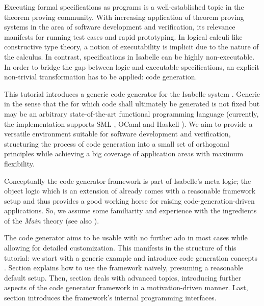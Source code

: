 %
\begin{isabellebody}%
\def\isabellecontext{Codegen}%
%
\isadelimtheory
\isanewline
%
\endisadelimtheory
%
\isatagtheory
%
\endisatagtheory
{\isafoldtheory}%
%
\isadelimtheory
%
\endisadelimtheory
%
\isadelimML
%
\endisadelimML
%
\isatagML
%
\endisatagML
{\isafoldML}%
%
\isadelimML
%
\endisadelimML
%
\isamarkuptrue%
%
\isamarkuptrue%
%
\isamarkuptrue%
%
\begin{isamarkuptext}%
Executing formal specifications as programs is a well-established
  topic in the theorem proving community.  With increasing
  application of theorem proving systems in the area of
  software development and verification, its relevance manifests
  for running test cases and rapid prototyping.  In logical
  calculi like constructive type theory,
  a notion of executability is implicit due to the nature
  of the calculus.  In contrast, specifications in Isabelle
  can be highly non-executable.  In order to bridge
  the gap between logic and executable specifications,
  an explicit non-trivial transformation has to be applied:
  code generation.

  This tutorial introduces a generic code generator for the
  Isabelle system \cite{isa-tutorial}.
  Generic in the sense that the
   for which code shall ultimately be
  generated is not fixed but may be an arbitrary state-of-the-art
  functional programming language (currently, the implementation
  supports SML \cite{SML}, OCaml \cite{OCaml} and Haskell
  \cite{haskell-revised-report}).
  We aim to provide a
  versatile environment
  suitable for software development and verification,
  structuring the process
  of code generation into a small set of orthogonal principles
  while achieving a big coverage of application areas
  with maximum flexibility.

  Conceptually the code generator framework is part
  of Isabelle's  meta logic; the object logic
   which is an extension of 
  already comes with a reasonable framework setup and thus provides
  a good working horse for raising code-generation-driven
  applications.  So, we assume some familiarity and experience
  with the ingredients of the  \emph{Main} theory
  (see also \cite{isa-tutorial}).%
\end{isamarkuptext}%
\isamarkuptrue%
%
\isamarkuptrue%
%
\begin{isamarkuptext}%
The code generator aims to be usable with no further ado
  in most cases while allowing for detailed customization.
  This manifests in the structure of this tutorial:
  we start with a generic example 
  and introduce code generation concepts .
  Section
   explains how to use the framework naively,
  presuming a reasonable default setup.  Then, section
   deals with advanced topics,
  introducing further aspects of the code generator framework
  in a motivation-driven manner.  Last, section 
  introduces the framework's internal programming interfaces.


\end{isamarkuptext}
\end{isabellebody}
